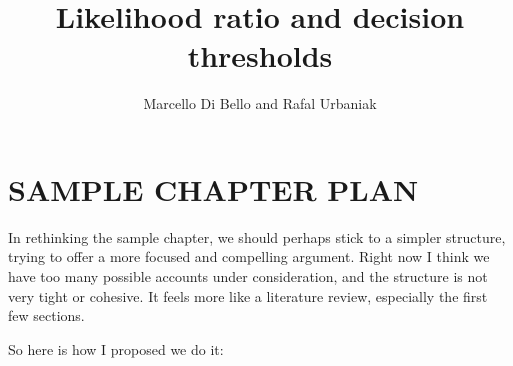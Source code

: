 \documentclass[10pt,dvipsnames,enabledeprecatedfontcommands]{scrartcl}
\title{Likelihood ratio and decision thresholds}
\author{Marcello Di Bello and Rafal Urbaniak}
\date{}
\begin{document}
\maketitle

\section*{SAMPLE CHAPTER PLAN}

In rethinking the sample chapter, we should perhaps stick to a simpler
structure, trying to offer a more focused and compelling argument. Right
now I think we have too many possible accounts under consideration, and
the structure is not very tight or cohesive. It feels more like a
literature review, especially the first few sections.

So here is how I proposed we do it:
\end{document}
